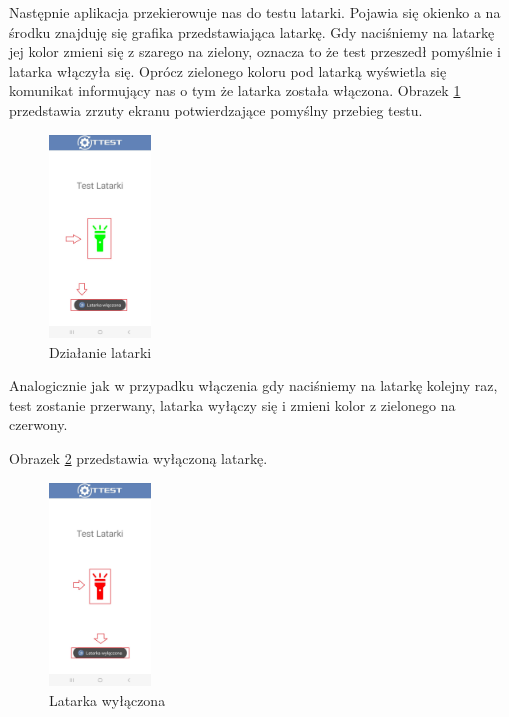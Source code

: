 \newpage


Następnie aplikacja przekierowuje nas do testu latarki. Pojawia się okienko a na środku znajduję się grafika przedstawiająca latarkę. Gdy naciśniemy na latarkę jej kolor zmieni się z szarego na zielony, oznacza to że test przeszedł pomyślnie i latarka włączyła się. Oprócz zielonego koloru pod latarką wyświetla się komunikat informujący nas o tym że latarka została włączona. 
\newline
Obrazek \ref{rys:latarka2} przedstawia zrzuty ekranu potwierdzające pomyślny przebieg testu.

\begin{figure}[!hbt]
	\begin{center}
		\includegraphics[angle=360, width=0.24\textwidth]{rys/punkt6/latarka2.jpg}
		\caption{Działanie latarki}
		\label{rys:latarka2}
	\end{center}
\end{figure}

Analogicznie jak w przypadku włączenia gdy naciśniemy na latarkę kolejny raz, test zostanie przerwany, latarka wyłączy się i zmieni kolor z zielonego na czerwony.



Obrazek \ref{rys:latarka3} przedstawia wyłączoną latarkę.

\begin{figure}[!hbt]
	\begin{center}
		\includegraphics[angle=360, width=0.24\textwidth]{rys/punkt6/latarka3.jpg}
		\caption{Latarka wyłączona}
		\label{rys:latarka3}
	\end{center}
\end{figure}

